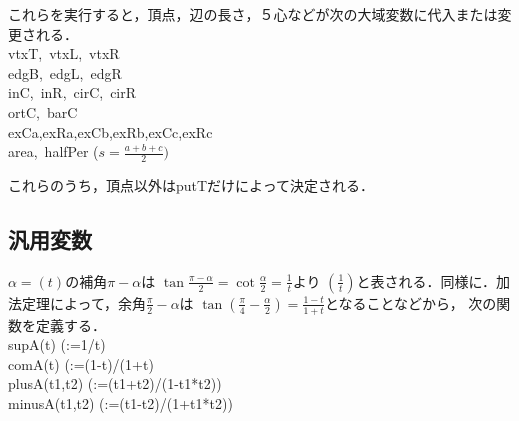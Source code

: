 \documentclass[a4j,12pt]{jarticle}
\begin{document}
これらを実行すると，頂点，辺の長さ，５心などが次の大域変数に代入または変更される．\vspace{2mm}\\
\hspace*{2zw}vtxT,\ vtxL,\ vtxR\\
\hspace*{2zw}edgB,\ edgL,\ edgR\\
\hspace*{2zw}inC,\ inR,\ cirC,\ cirR\\
\hspace*{2zw}ortC,\ barC\\
\hspace*{2zw}exCa,exRa,exCb,exRb,exCc,exRc\\
\hspace*{2zw}area,\ halfPer ($s=\frac{a+b+c}{2})$\vspace{2mm}


これらのうち，頂点以外はputTだけによって決定される．
\subsection{汎用変数}
$\alpha=(t)$の補角$\pi-\alpha$は
$\tan\frac{\pi-\alpha}{2}=\cot\frac{\alpha}{2}=\frac{1}{t}$\vspace{1mm}より
$(\frac{1}{t})$と表される．同様に．加法定理によって，余角$\frac{\pi}{2}-\alpha$は
$\tan(\frac{\pi}{4}-\frac{\alpha}{2})=\frac{1-t}{1+t}$\vspace{1mm}となることなどから，
次の関数を定義する．\\
\hspace*{2zw}supA(t) (:=1/t)\\
\hspace*{2zw}comA(t) (:=(1-t)/(1+t)\\
\hspace*{2zw}plusA(t1,t2) (:=(t1+t2)/(1-t1*t2))\\
\hspace*{2zw}minusA(t1,t2) (:=(t1-t2)/(1+t1*t2))\\
\end{document}

